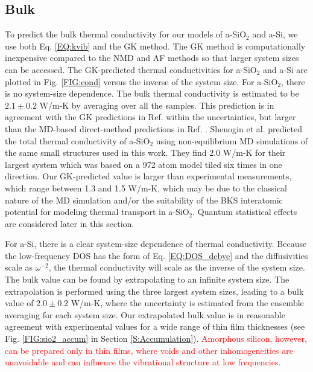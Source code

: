 \documentclass[aps,prb,onecolumn,preprint,superscriptaddress,footinbib,amsmath,amssymb,floatfix]{revtex4}
\begin{document}
\subsection{\label{S:Bulk}Bulk}

To predict the bulk thermal conductivity for our models of a-SiO$_2$ and 
a-Si, we use both Eq. \eqref{EQ:kvib} 
and the GK method. The GK method is computationally 
inexpensive compared to the NMD and AF methods so that 
larger system sizes can be accessed.  
The GK-predicted thermal conductivities for a-SiO$_2$ and a-Si 
are plotted in Fig. \ref{FIG:cond} versus the inverse of the system 
size. For a-SiO$_2$, there is no system-size dependence.  
The bulk thermal conductivity is estimated to be 
$2.1 \pm 0.2$ W/m-K by averaging over all the samples. This prediction 
is in agreement with the GK predictions in Ref. 
 within the uncertainties, 
but larger than the MD-based direct-method predictions in Ref. 
. 
Shenogin et al. predicted the total thermal 
conductivity of a-SiO$_2$ using 
non-equilibrium MD simulations of the same small structures 
used in this work. They find 2.0 W/m-K for their 
largest system which was based on a 972 atom model 
tiled six times in one direction.\cite{shenogin_predicting_2009}
Our GK-predicted value is larger than experimental 
measurements, which range between 
1.3 and 1.5 W/m-K,
\cite{cahill_lattice_1988,lee_heat_1997,
yamane_measurement_2002,regner_broadband_2013} 
which may be due to the classical nature of the MD simulation 
and/or the suitability of the BKS interatomic potential 
for modeling thermal transport in a-SiO$_2$.
\cite{jund_molecular-dynamics_1999,mcgaughey_thermal_2004}
Quantum statistical effects are considered later in this section. 

For a-Si, there is a clear system-size dependence of thermal 
conductivity. 
Because the low-frequency DOS has the form of Eq. \eqref{EQ:DOS_debye} 
and the diffusivities scale as $\omega^{-2}$,  
the thermal conductivity will scale as the inverse of the system size. 
The bulk value can be found by extrapolating to an infinite system size.
\cite{shiomi_thermal_2011,esfarjani_heat_2011,larkin_comparison_2012} 
The extrapolation is performed using the three largest 
system sizes,\cite{mfp_fn2} leading to a bulk value 
of $2.0 \pm 0.2$ W/m-K, where the uncertainty is 
estimated from the ensemble averaging for each system size. 
Our extrapolated bulk value 
is in reasonable agreement with experimental values for a wide 
range of thin film thicknesses (see Fig. \ref{FIG:sio2_accum} in 
Section \ref{S:Accumulation}). 
\textcolor{red}{
Amorphous silicon, however, can be prepared only in thin films, 
where voids and other inhomogeneities are unavoidable
\cite{vacher_attenuation_1980,feldman_thermal_1993,liu_high_2009,
yang_anomalously_2010,li_effect_2011} and can influence the 
vibrational structure at low frequencies.
\cite{feldman_tight-binding_2004,liu_high_2009}
}
\end{document}

